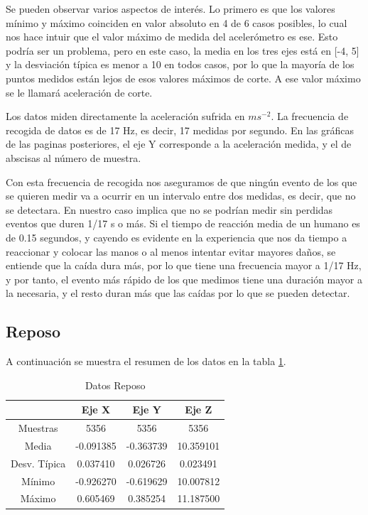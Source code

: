 \documentclass[12pt]{book}
\numberwithin{equation}{section}
\begin{document}
Se pueden observar varios aspectos de interés. Lo primero es que los valores mínimo y máximo coinciden en valor absoluto en 4 de 6 casos posibles, lo cual nos hace intuir que el valor máximo de medida del acelerómetro es ese. Esto podría ser un problema, pero en este caso, la media en los tres ejes está en [-4, 5] y la desviación típica es menor a 10 en todos casos, por lo que la mayoría de los puntos medidos están lejos de esos valores máximos de corte.  A ese valor máximo se le llamará aceleración de corte.

Los datos miden directamente la aceleración sufrida en $m s^{-2}$. La frecuencia de recogida de datos es de 17 Hz, es decir, 17 medidas por segundo. En las gráficas de las paginas posteriores, el eje Y corresponde a la aceleración medida, y el de abscisas al número de muestra.

Con esta frecuencia de recogida nos aseguramos de que ningún evento de los que se quieren medir va a ocurrir en un intervalo entre dos medidas, es decir, que no se detectara. En nuestro caso implica que no se podrían medir sin perdidas eventos que duren 1/17 s o más. Si el tiempo de reacción media de un humano es de 0.15 segundos, y cayendo es evidente en la experiencia que nos da tiempo a reaccionar y colocar las manos o al menos intentar evitar mayores daños, se entiende que la caída dura más, por lo que tiene una frecuencia mayor a 1/17 Hz, y por tanto, el evento más rápido de los que medimos tiene una duración mayor a la necesaria, y el resto duran más que las caídas por lo que se pueden detectar. 

\subsection{Reposo}

A continuación se muestra el resumen de los datos en la tabla \ref{tabla3}.

\begin{table}[h]
\centering
\caption{Datos Reposo}
\begin{tabular}{| c | c | c | c |}
\hline
 & Eje X & Eje Y & Eje Z \\
\hline
Muestras & 5356 & 5356 & 5356 \\
\hline
Media & -0.091385 & -0.363739 & 10.359101 \\
\hline
Desv. Típica & 0.037410 & 0.026726 & 0.023491 \\
\hline
Mínimo & -0.926270 & -0.619629 & 10.007812 \\
\hline
Máximo & 0.605469 & 0.385254 & 11.187500 \\
\hline
\end{tabular}
\label{tabla3}
\end{table}
\end{document}
